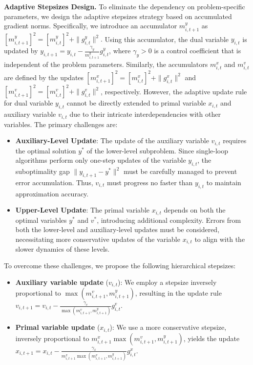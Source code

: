 \documentclass{article}
\theoremstyle{plain}
\theoremstyle{definition}
\theoremstyle{remark}
\begin{document}
\textbf{Adaptive Stepsizes Design.}
To eliminate the dependency on problem-specific parameters, we design the adaptive stepsizes strategy based on accumulated gradient norms. Specifically, we introduce an accumulator $m^y_{i,t+1}$ as $[m^y_{i,t+1}]^2 = [m^y_{i,t}]^2 + \|g^y_{i,t}\|^2.$ Using this accumulator, the dual variable $y_{i,t}$ is updated by $y_{i,t+1} = y_{i,t} - \frac{\gamma_y}{m^y_{i,t+1}} g^y_{i,t}$,
where $\gamma_y >0$ is a control coefficient that is independent of the problem parameters. Similarly, the accumulators $m^x_{i,t}$ and $m^v_{i,t}$ are defined by the updates $[m^x_{i,t+1}]^2 = [m^x_{i,t}]^2 + \|g^x_{i,t}\|^2$ and $[m^v_{i,t+1}]^2 = [m^v_{i,t}]^2 + \|g^v_{i,t}\|^2$, respectively.
However, the adaptive update rule for dual variable \(y_{i,t}\) cannot be directly extended to primal variable \(x_{i,t}\) and auxiliary variable \(v_{i,t}\) due to their intricate interdependencies with other variables. The primary challenges are:  
\begin{itemize}[topsep=0pt, itemsep=2pt, parsep=0pt, leftmargin=0.25cm]
    \item \textbf{Auxiliary-Level Update}: The update of the auxiliary variable \(v_{i,t}\) requires the optimal solution \(y^*\) of the lower-level subproblem. Since single-loop algorithms perform only one-step updates of the variable \(y_{i,t}\), the suboptimality gap \(\|y_{i,t+1} - y^*\|^2\) must be carefully managed to prevent error accumulation. Thus, \(v_{i,t}\) must progress no faster than \(y_{i,t}\) to maintain approximation accuracy.  

    \item \textbf{Upper-Level Update}: The primal variable \(x_{i,t}\) depends on both the optimal variables \(y^*\) and \(v^*\), introducing additional complexity. Errors from both the lower-level and auxiliary-level updates must be considered, necessitating more conservative updates of the variable \(x_{i,t}\) to align with the slower dynamics of these levels.  
\end{itemize}

To overcome these challenges, we propose the following hierarchical stepsizes:
\begin{itemize}[topsep=0pt, itemsep=2pt, parsep=0pt, leftmargin=0.25cm]
 \item \textbf{Auxiliary variable update} (\(v_{i,t}\)):  
   We employ a stepsize inversely proportional to \({\max(m^v_{i,t+1}, m^y_{i,t+1})}\), resulting in the update rule 
$v_{i,t+1} = v_{i,t} - \frac{\gamma_v}{\max(m^v_{i,t+1}, m^y_{i,t+1})} g^v_{i,t}$.
    \item \textbf{Primal variable update} (\(x_{i,t}\)):  
    We use a more conservative stepsize, inversely proportional to \(m^x_{i,t+1} \max(m^v_{i,t+1}, m^y_{i,t+1})\), yields the update \(x_{i,t+1} = x_{i,t} - \frac{\gamma_x}{m^x_{i,t+1} \max(m^v_{i,t+1}, m^y_{i,t+1})} g^x_{i,t}\).
\end{itemize}
\end{document}
